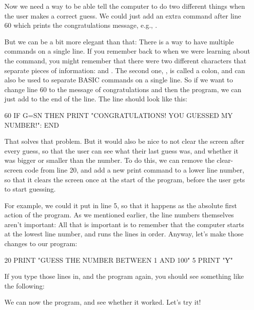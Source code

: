Now we need a way to be able tell the computer to do two different
things when the user makes a correct guess. We could just add an extra
 command after line 60 which prints the congratulations
message, e.g., .

But we can be a bit more
elegant than that: There is a way to have multiple commands on a
single line.  If you remember back to when we were learning about the
 command, you might remember that there were two different
characters that separate pieces of information: \stw{,} and
\stw{:}. The second one, \stw{:}, is called a colon, and can also be
used to separate BASIC commands on a single line.  So if we want to
change line 60 to  the message of congratulations and then
 the program, we can just add  to the end of the
line. The line should look like this:

\begin{screenoutput}
  60 IF G=SN THEN PRINT "CONGRATULATIONS! YOU GUESSED MY NUMBER!": END
\end{screenoutput}

That solves that problem.  But it would also be nice to not clear the
screen after every guess, so that the user can see what their last
guess was, and whether it was bigger or smaller than the number.  To
do this, we can remove the clear-screen code from line 20, and add a
new print command to a lower line number, so that it clears the screen
once at the start of the program, before the user gets to start
guessing.

\needspace{2cm}
For example, we could it put in line 5, so that it happens
as the absolute first action of the program.  As we mentioned
earlier, the line numbers themselves aren't important: All that is
important is to remember that the computer starts at the lowest line
number, and runs the lines in order.  Anyway, let's make those changes
to our program:

\begin{screenoutput}
  20 PRINT "GUESS THE NUMBER BETWEEN 1 AND 100"
  5 PRINT "Ƴ"
\end{screenoutput}

\needspace{4cm}
If you type those lines in, and  the program again, you
should see something like the following:


\needspace{4cm}
We can now  the program, and see whether it worked. Let's try it!

